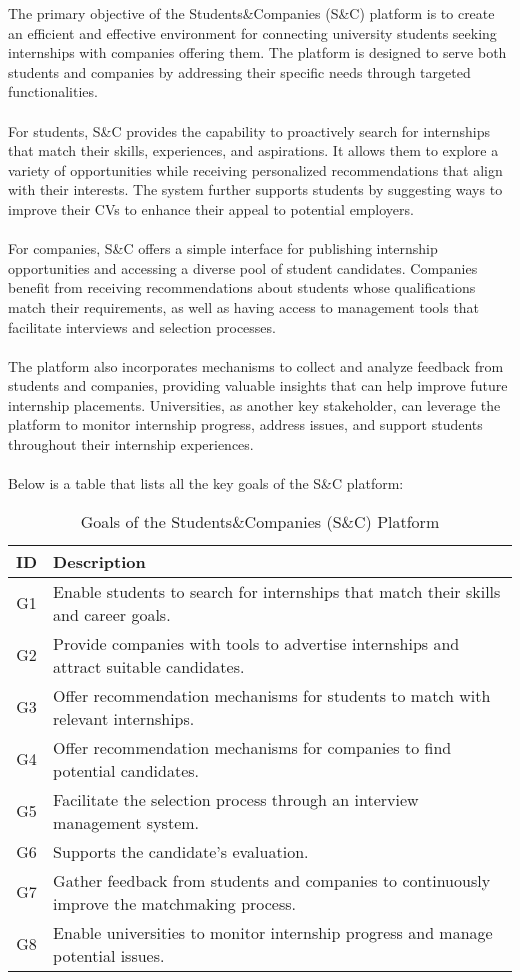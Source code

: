 The primary objective of the Students\&Companies (S\&C) platform is to create an efficient and effective environment for connecting university students seeking internships with companies offering them. The platform is designed to serve both students and companies by addressing their specific needs through targeted functionalities. \\ \\
For students, S\&C provides the capability to proactively search for internships that match their skills, experiences, and aspirations. It allows them to explore a variety of opportunities while receiving personalized recommendations that align with their interests. The system further supports students by suggesting ways to improve their CVs to enhance their appeal to potential employers. \\ \\
For companies, S\&C offers a simple interface for publishing internship opportunities and accessing a diverse pool of student candidates. Companies benefit from receiving recommendations about students whose qualifications match their requirements, as well as having access to management tools that facilitate interviews and selection processes. \\ \\
The platform also incorporates mechanisms to collect and analyze feedback from students and companies, providing valuable insights that can help improve future internship placements. Universities, as another key stakeholder, can leverage the platform to monitor internship progress, address issues, and support students throughout their internship experiences. \\ \\
Below is a table that lists all the key goals of the S\&C platform:
\begin{table}[h!]
\renewcommand{\arraystretch}{1.8}
\centering
\begin{tabular}{|c|p{12cm}|}
\hline
\textbf{ID} & \textbf{Description} \\ \hline
G1 & Enable students to search for internships that match their skills and career goals. \\ \hline
G2 & Provide companies with tools to advertise internships and attract suitable candidates. \\ \hline
G3 & Offer recommendation mechanisms for students to match with relevant internships. \\ \hline
G4 & Offer recommendation mechanisms for companies to find potential candidates.\\ \hline
G5 &  Facilitate the selection process through an interview management system. \\ \hline
G6 & Supports the candidate's evaluation.\\ \hline
G7 & Gather feedback from students and companies to continuously improve the matchmaking process. \\ \hline
G8 & Enable universities to monitor internship progress and manage potential issues. \\ \hline
\end{tabular}
\caption{Goals of the Students\&Companies (S\&C) Platform}
\end{table}

